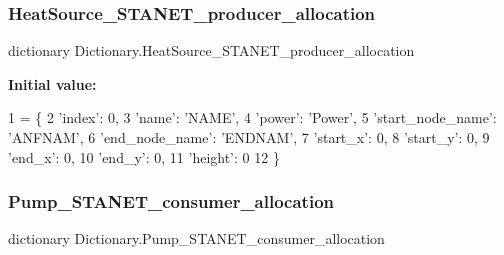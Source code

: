 \subsubsection{\texorpdfstring{Heat\+Source\+\_\+\+S\+T\+A\+N\+E\+T\+\_\+producer\+\_\+allocation}{HeatSource\_STANET\_producer\_allocation}}
{\footnotesize\ttfamily dictionary Dictionary.\+Heat\+Source\+\_\+\+S\+T\+A\+N\+E\+T\+\_\+producer\+\_\+allocation}

{\bfseries Initial value\+:}
\begin{DoxyCode}
1 =  \{
2                                          \textcolor{stringliteral}{'index'}: 0,
3                                          \textcolor{stringliteral}{'name'}: \textcolor{stringliteral}{'NAME'},
4                                          \textcolor{stringliteral}{'power'}: \textcolor{stringliteral}{'Power'},
5                                          \textcolor{stringliteral}{'start\_node\_name'}: \textcolor{stringliteral}{'ANFNAM'},
6                                          \textcolor{stringliteral}{'end\_node\_name'}: \textcolor{stringliteral}{'ENDNAM'},
7                                          \textcolor{stringliteral}{'start\_x'}: 0,
8                                          \textcolor{stringliteral}{'start\_y'}: 0,
9                                          \textcolor{stringliteral}{'end\_x'}: 0,
10                                          \textcolor{stringliteral}{'end\_y'}: 0,
11                                          \textcolor{stringliteral}{'height'}: 0
12                                          \}
\end{DoxyCode}
\mbox{\label{namespace_dictionary_a372356497cc875933e355473f718698c}} 
\subsubsection{\texorpdfstring{Pump\+\_\+\+S\+T\+A\+N\+E\+T\+\_\+consumer\+\_\+allocation}{Pump\_STANET\_consumer\_allocation}}
{\footnotesize\ttfamily dictionary Dictionary.\+Pump\+\_\+\+S\+T\+A\+N\+E\+T\+\_\+consumer\+\_\+allocation}

